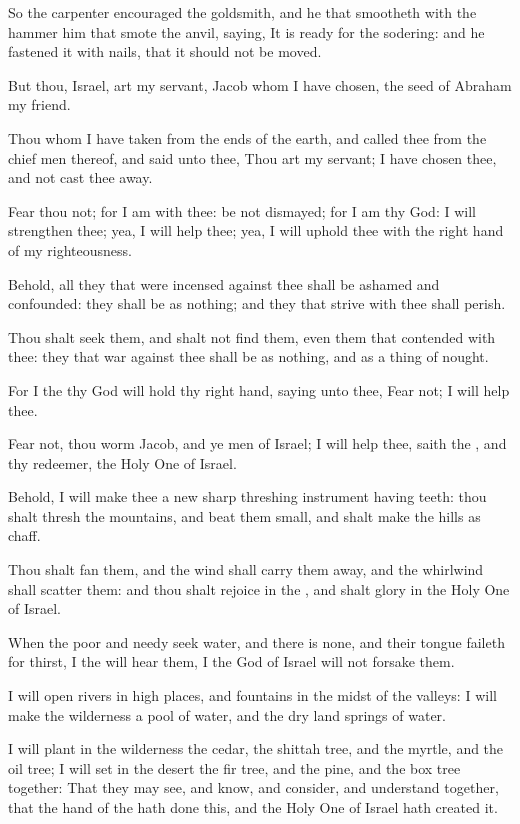 \verse So the carpenter encouraged the goldsmith, and he that smootheth with the hammer him that smote the anvil, saying, It is ready for the sodering: and he fastened it with nails, that it should not be moved.

\verse But thou, Israel, art my servant, Jacob whom I have chosen, the seed of Abraham my friend.

\verse Thou whom I have taken from the ends of the earth, and called thee from the chief men thereof, and said unto thee, Thou art my servant; I have chosen thee, and not cast thee away.

\verse Fear thou not; for I am with thee: be not dismayed; for I am thy God: I will strengthen thee; yea, I will help thee; yea, I will uphold thee with the right hand of my righteousness.

\verse Behold, all they that were incensed against thee shall be ashamed and confounded: they shall be as nothing; and they that strive with thee shall perish.

\verse Thou shalt seek them, and shalt not find them, even them that contended with thee: they that war against thee shall be as nothing, and as a thing of nought.

\verse For I the \LORD thy God will hold thy right hand, saying unto thee, Fear not; I will help thee.

\verse Fear not, thou worm Jacob, and ye men of Israel; I will help thee, saith the \LORD, and thy redeemer, the Holy One of Israel.

\verse Behold, I will make thee a new sharp threshing instrument having teeth: thou shalt thresh the mountains, and beat them small, and shalt make the hills as chaff.

\verse Thou shalt fan them, and the wind shall carry them away, and the whirlwind shall scatter them: and thou shalt rejoice in the \LORD, and shalt glory in the Holy One of Israel.

\verse When the poor and needy seek water, and there is none, and their tongue faileth for thirst, I the \LORD will hear them, I the God of Israel will not forsake them.

\verse I will open rivers in high places, and fountains in the midst of the valleys: I will make the wilderness a pool of water, and the dry land springs of water.

\verse I will plant in the wilderness the cedar, the shittah tree, and the myrtle, and the oil tree; I will set in the desert the fir tree, and the pine, and the box tree together: \verse That they may see, and know, and consider, and understand together, that the hand of the \LORD hath done this, and the Holy One of Israel hath created it.

